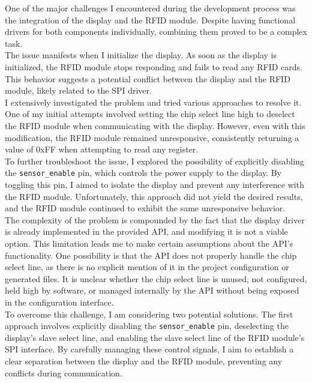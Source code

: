 \documentclass[a4paper,11pt]{article}%
\begin{document}
One of the major challenges I encountered during the development process was the integration of the display and the RFID module. Despite having functional drivers for both components individually, combining them proved to be a complex task.\\

The issue manifests when I initialize the display. As soon as the display is initialized, the RFID module stops responding and fails to read any RFID cards. This behavior suggests a potential conflict between the display and the RFID module, likely related to the SPI driver.\\

I extensively investigated the problem and tried various approaches to resolve it. One of my initial attempts involved setting the chip select line high to deselect the RFID module when communicating with the display. However, even with this modification, the RFID module remained unresponsive, consistently returning a value of 0xFF when attempting to read any register.\\

To further troubleshoot the issue, I explored the possibility of explicitly disabling the \texttt{sensor\_enable} pin, which controls the power supply to the display. By toggling this pin, I aimed to isolate the display and prevent any interference with the RFID module. Unfortunately, this approach did not yield the desired results, and the RFID module continued to exhibit the same unresponsive behavior.\\

The complexity of the problem is compounded by the fact that the display driver is already implemented in the provided API, and modifying it is not a viable option. This limitation leads me to make certain assumptions about the API's functionality. One possibility is that the API does not properly handle the chip select line, as there is no explicit mention of it in the project configuration or generated files. It is unclear whether the chip select line is unused, not configured, held high by software, or managed internally by the API without being exposed in the configuration interface.\\

To overcome this challenge, I am considering two potential solutions. The first approach involves explicitly disabling the \texttt{sensor\_enable} pin, deselecting the display's slave select line, and enabling the slave select line of the RFID module's SPI interface. By carefully managing these control signals, I aim to establish a clear separation between the display and the RFID module, preventing any conflicts during communication.\\
\end{document}
